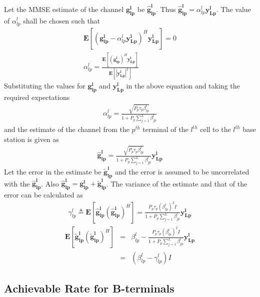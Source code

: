 \documentclass[10pt, a4paper, twoside,fleqn]{article}
\begin{document}
Let the MMSE estimate of the channel $\mathbf{g_{lp}^{l}}$ be $\mathbf{\hat g_{lp}^{l}}$. Thus $\mathbf{\hat g_{lp}^{l}} = \alpha_{lp}^{l}\mathbf{y_{Lp}^{l}}$. The value of $\alpha_{lp}^{l}$ shall be chosen such that
\begin{eqnarray*}
	\mathbf{E}[(\mathbf{g_{lp}^{l}}-\alpha_{lp}^{l}\mathbf{y_{Lp}^{l}})^H \mathbf{y_{Lp}^{l}}] = 0 \\
	\alpha_{lp}^{l} = \frac{\mathbf{E}[(\mathbf{g_{lp}^{l}})^H \mathbf{y_{Lp}^{l}}]}{\mathbf{E}[|\mathbf{y_{Lp}^{l}}|^2]}
\end{eqnarray*}
Substituting the values for $\mathbf{g_{lp}^{l}}$ and $\mathbf{y_{Lp}^{l}}$ in the above equation and taking the required expectations
\begin{eqnarray}\label{eq:alphapll}
	\alpha_{lp}^{l}=\frac{\sqrt{P_p \tau_p \beta_{lp}^{l}}}{1+P_p\sum_{j=1}^{L}\beta_{jp}^{l}}
\end{eqnarray}
and the estimate of the channel from the $p^{th}$ terminal of the $l^{th}$ cell to the $l^{th}$ base station is given as
\begin{eqnarray}\label{eq:estimatehpll}
	\mathbf{\hat g_{lp}^{l}} = \frac{\sqrt{P_p\tau_p\beta_{lp}^{l}}}{1+P_p\sum_{j=1}^{L}\beta_{jp}^{l}} \mathbf{y_{Lp}^{l}}
\end{eqnarray}
Let the error in the estimate be ${\mathbf{\widetilde{g}_{lp}^{l}}}$ and the error is assumed to be uncorrelated with the $\mathbf{\hat g_{lp}^{l}}$. Also $\mathbf{\hat g_{lp}^{l}} =\mathbf{g_{lp}^{l}}+\mathbf{\widetilde{g}_{lp}^{l}}$.
The variance of the estimate and that of the error can be calculated as
\begin{eqnarray}
	\gamma_{lp}^{l} \triangleq \mathbf{E}[\mathbf{\hat g_{lp}^{l}}(\mathbf{\hat g_{lp}^{l}})^H]
                            =      \frac{P_p\tau_p(\beta_{lp}^{l})^2I}{1+P_p\sum_{j=1}^{L}\beta_{jp}^{l}} \mathbf{y_{Lp}^{l}}
\end{eqnarray}
\begin{eqnarray}
    \mathbf{E}[\mathbf{\widetilde{g}_{lp}^{l}} (\mathbf{\widetilde{g}_{lp}^{l}})^H] &=& \beta_{lp}^{l}- \frac{P_p\tau_p(\beta_{lp}^{l})^2I}{1+P_p\sum_{j=1}^{L}\beta_{jp}^{l}} \mathbf{y_{Lp}^{l}} \nonumber\\
          									    &=& (\beta_{lp}^{l} - \gamma_{lp}^{l})I
\end{eqnarray}

\subsection{Achievable Rate for B-terminals}
\end{document}
